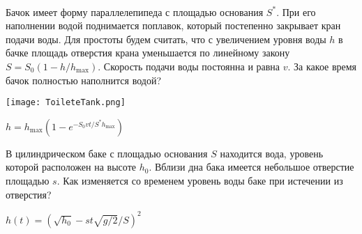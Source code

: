 \begin{ex}
\hspace{0pt} \\
\begin{minipage}{.65\textwidth}
Бачок имеет форму параллелепипеда с площадью основания $S^*$. При его наполнении водой поднимается поплавок, который постепенно закрывает кран подачи воды. Для простоты будем считать, что с увеличением уровня воды $h$ в бачке площадь отверстия крана уменьшается по линейному закону $S = S_0 (1 - h/h_{\max})$. Скорость подачи воды постоянна и равна $v$. За какое время бачок полностью наполнится водой?
\end{minipage}
\begin{minipage}{.35\textwidth}
\centering
\texttt{[image: ToileteTank.png]}
\end{minipage}
\begin{ans}
$h = h_{\max}(1-e^{-S_0vt/S^*h_{\max}})$
\end{ans}
\end{ex}

\begin{ex}
В цилиндрическом баке с площадью основания $S$ находится вода, уровень которой расположен на высоте $h_0$. Вблизи дна бака имеется небольшое отверстие площадью $s$. Как изменяется со временем уровень воды баке при истечении из отверстия?
\begin{ans}
$h(t) = \left(\sqrt{h_0} - s t \sqrt{g/2} /S \right)^2$
\end{ans}
\end{ex}

